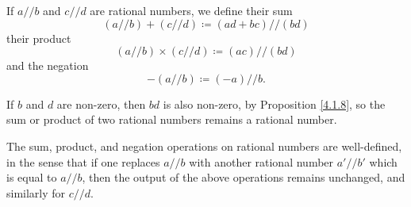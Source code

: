 \begin{definition}\label{4.2.2}
    If \(a // b\) and \(c // d\) are rational numbers, we define their sum
    \[
        (a // b) + (c // d) \coloneqq (ad + bc) // (bd)
    \]
    their product
    \[
        (a // b) \times (c // d) \coloneqq (ac) // (bd)
    \]
    and the negation
    \[
        -(a // b) \coloneqq (-a) // b.
    \]
\end{definition}

\begin{note}
    If \(b\) and \(d\) are non-zero, then \(bd\) is also non-zero, by Proposition \ref{4.1.8}, so the sum or product of two rational numbers remains a rational number.
\end{note}

\begin{lemma}\label{4.2.3}
    The sum, product, and negation operations on rational numbers are well-defined, in the sense that if one replaces \(a // b\) with another rational number \(a' // b'\) which is equal to \(a // b\), then the output of the above operations remains unchanged, and similarly for \(c // d\).
\end{lemma}

